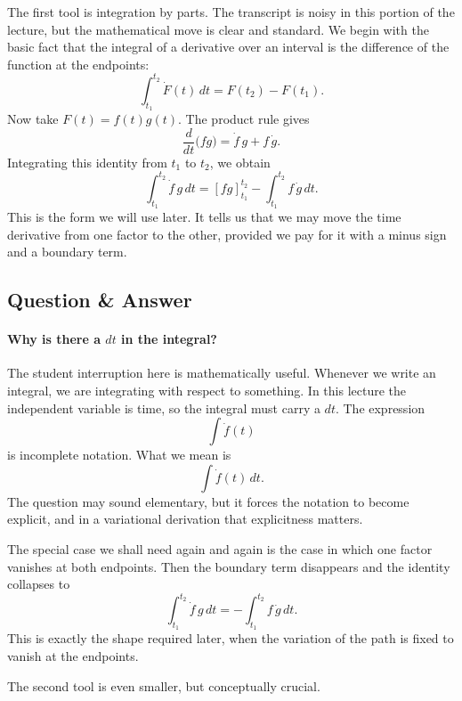 The first tool is integration by parts. The transcript is noisy in this portion of the lecture, but the mathematical move is clear and standard. We begin with the basic fact that the integral of a derivative over an interval is the difference of the function at the endpoints:
\begin{equation}
\int_{t_1}^{t_2}\dot F(t)\,dt = F(t_2)-F(t_1).
\end{equation}
Now take \(F(t)=f(t)g(t)\). The product rule gives
\begin{equation}
\frac{d}{dt}\big(fg\big)=\dot f\,g+f\,\dot g.
\end{equation}
Integrating this identity from \(t_1\) to \(t_2\), we obtain
\begin{equation}
\int_{t_1}^{t_2}\dot f\,g\,dt = [fg]_{t_1}^{t_2}-\int_{t_1}^{t_2}f\,\dot g\,dt.
\end{equation}
This is the form we will use later. It tells us that we may move the time derivative from one factor to the other, provided we pay for it with a minus sign and a boundary term.

\subsection{Question \& Answer}

\paragraph{Why is there a \(dt\) in the integral?}
The student interruption here is mathematically useful. Whenever we write an integral, we are integrating with respect to something. In this lecture the independent variable is time, so the integral must carry a \(dt\). The expression
\[
\int \dot f(t)
\]
is incomplete notation. What we mean is
\[
\int \dot f(t)\,dt.
\]
The question may sound elementary, but it forces the notation to become explicit, and in a variational derivation that explicitness matters.

The special case we shall need again and again is the case in which one factor vanishes at both endpoints. Then the boundary term disappears and the identity collapses to
\begin{equation}
\int_{t_1}^{t_2}\dot f\,g\,dt = -\int_{t_1}^{t_2}f\,\dot g\,dt.
\end{equation}
This is exactly the shape required later, when the variation of the path is fixed to vanish at the endpoints.

The second tool is even smaller, but conceptually crucial.

